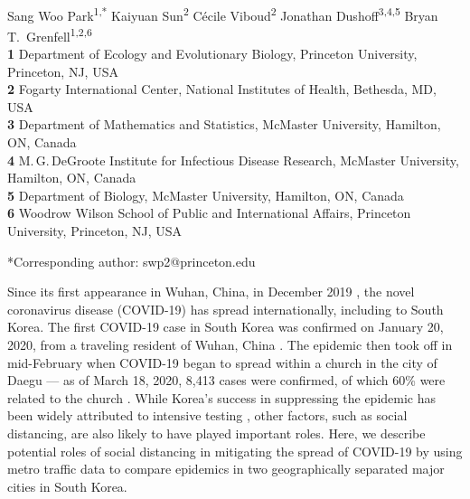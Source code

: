\documentclass[12pt]{article}
\date{\today}
\begin{document}
\begin{flushleft}{
	\Large
	\textbf{}
}
\newline
\\
Sang Woo Park\textsuperscript{1,*}
Kaiyuan Sun\textsuperscript{2}
C\'ecile Viboud\textsuperscript{2}
Jonathan Dushoff\textsuperscript{3,4,5}
Bryan T.\ Grenfell\textsuperscript{1,2,6}
\\
\bigskip
\textbf{1} Department of Ecology and Evolutionary Biology, Princeton University, Princeton, NJ, USA
\\
\textbf{2} Fogarty International Center, National Institutes of Health, Bethesda, MD, USA
\\
\textbf{3} Department of Mathematics and Statistics, McMaster University, Hamilton, ON, Canada
\\
\textbf{4} M.\,G.\,DeGroote Institute for Infectious Disease Research, McMaster University, Hamilton, ON, Canada
\\
\textbf{5} Department of Biology, McMaster University, Hamilton, ON, Canada
\\
\textbf{6} Woodrow Wilson School of Public and International Affairs, Princeton University, Princeton, NJ, USA
\\
\bigskip

*Corresponding author: swp2@princeton.edu
\end{flushleft}

\pagebreak

Since its first appearance in Wuhan, China, in December 2019 \citep{pneumonia}, the novel coronavirus disease (COVID-19) has spread internationally, including to South Korea.
The first COVID-19 case in South Korea was confirmed on January 20, 2020, from a traveling resident of Wuhan, China \citep{kcdc}.
The epidemic then took off in mid-February when COVID-19 began to spread within a church in the city of Daegu --- as of March 18, 2020, 8,413 cases were confirmed, of which 60\% were related to the church \citep{kcdc}.
While Korea's success in suppressing the epidemic has been widely attributed to intensive testing \citep{fergusonimpact, science}, other factors, such as social distancing, are also likely to have played important roles.
Here, we describe potential roles of social distancing in mitigating the spread of COVID-19 by using metro traffic data to compare epidemics in two geographically separated major cities in South Korea.
\end{document}
